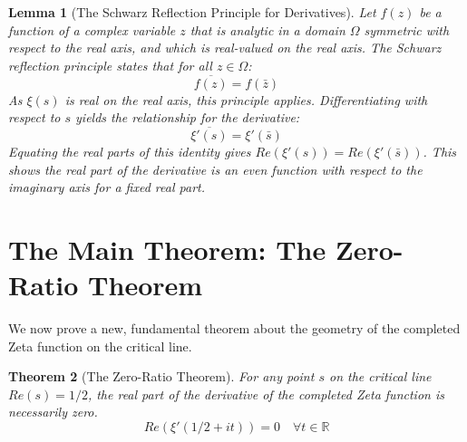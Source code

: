 \documentclass{article}
\newtheorem{theorem}{Theorem}[section]
\newtheorem{lemma}[theorem]{Lemma}
\begin{document}
\begin{lemma}[The Schwarz Reflection Principle for Derivatives]
Let $f(z)$ be a function of a complex variable $z$ that is analytic in a domain $\Omega$ symmetric with respect to the real axis, and which is real-valued on the real axis. The Schwarz reflection principle states that for all $z \in \Omega$:
$$ \overline{f(z)} = f(\bar{z}) $$
As $\xi(s)$ is real on the real axis, this principle applies. Differentiating with respect to $s$ yields the relationship for the derivative:
$$ \overline{\xi'(s)} = \xi'(\bar{s}) $$
Equating the real parts of this identity gives $Re(\xi'(s)) = Re(\xi'(\bar{s}))$. This shows the real part of the derivative is an even function with respect to the imaginary axis for a fixed real part.
\end{lemma}

\section{The Main Theorem: The Zero-Ratio Theorem}
We now prove a new, fundamental theorem about the geometry of the completed Zeta function on the critical line.

\begin{theorem}[The Zero-Ratio Theorem]
For any point $s$ on the critical line $Re(s)=1/2$, the real part of the derivative of the completed Zeta function is necessarily zero.
$$ Re(\xi'(1/2 + it)) = 0 \quad \forall t \in \mathbb{R} $$
\end{theorem}
\end{document}
